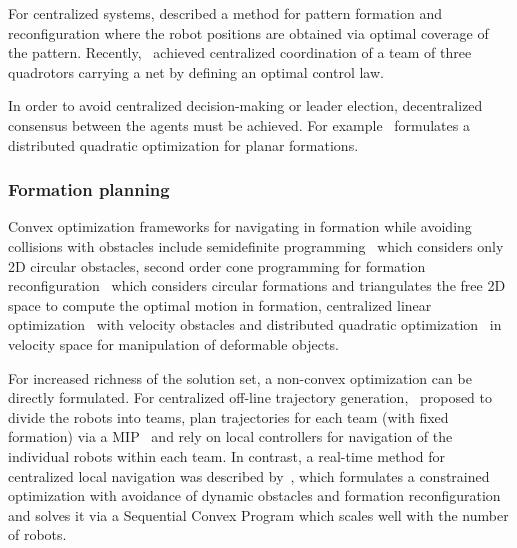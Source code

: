 For centralized systems, \cite{alonsomora12ijrr} described a method for pattern formation and reconfiguration where the robot positions are obtained via optimal coverage of the pattern. Recently,~\cite{Ritz:uc} achieved centralized coordination of a team of three quadrotors carrying a net by defining an optimal control law.

In order to avoid centralized decision-making or leader election, decentralized consensus between the agents must be achieved. For example~\cite{Montijano:2014bn} formulates a distributed quadratic optimization for planar formations.

\subsubsection{Formation planning}
Convex optimization frameworks for navigating in formation while avoiding collisions with obstacles include semidefinite programming~\cite{Derenick:2010cc} which considers only 2D circular obstacles, second order cone programming for formation reconfiguration~\cite{Derenick:2007wb} which considers circular formations and triangulates the free 2D space to compute the optimal motion in formation, centralized linear optimization~\cite{Karamouzas:wm} with velocity obstacles and distributed quadratic optimization~\cite{AlonsoMora:2015wi} in velocity space for manipulation of deformable objects. 

For increased richness of the solution set, a non-convex optimization can be directly formulated. For centralized off-line trajectory generation,~\cite{Kushleyev:2012wy} proposed to divide the robots into teams, plan trajectories for each team (with fixed formation) via a MIP~\cite{Mellinger:2012fi} and rely on local controllers for navigation of the individual robots within each team.
In contrast, a real-time method for centralized local navigation was described by~\cite{alonsomora15iros}, which formulates a constrained optimization with avoidance of dynamic obstacles and formation reconfiguration and solves it via a Sequential Convex Program which scales well with the number of robots.










